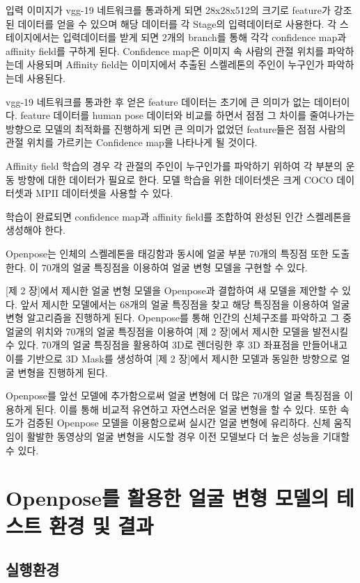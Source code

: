 \documentclass{oblivoir}
\begin{document}
입력 이미지가 vgg-19 네트워크를 통과하게 되면 28x28x512의 크기로 feature가 강조된 데이터를 얻을 수 있으며 해당 데이터를 각 Stage의 입력데이터로 사용한다. 각 스테이지에서는 입력데이터를 받게 되면 2개의 branch를 통해 각각 confidence map과 affinity field를 구하게 된다. Confidence map은 이미지 속 사람의 관절 위치를 파악하는데 사용되며 Affinity field는 이미지에서 추출된 스켈레톤의 주인이 누구인가 파악하는데 사용된다.

vgg-19 네트워크를 통과한 후 얻은 feature 데이터는 초기에 큰 의미가 없는 데이터이다. feature 데이터를 human pose 데이터와 비교를 하면서 점점 그 차이를 줄여나가는 방향으로 모델의 최적화를 진행하게 되면 큰 의미가 없었던 feature들은 점점 사람의 관절 위치를 가르키는 Confidence map을 나타나게 될 것이다.

Affinity field 학습의 경우 각 관절의 주인이 누구인가를 파악하기 위하여 각 부분의 운동 방향에 대한 데이터가 필요로 한다. 모델 학습을 위한 데이터셋은 크게 COCO 데이터셋과 MPII 데이터셋을 사용할 수 있다.

학습이 완료되면 confidence map과 affinity field를 조합하여 완성된 인간 스켈레톤을 생성해야 한다.

Openpose는 인체의 스켈레톤을 태깅함과 동시에 얼굴 부분 70개의 특징점 또한 도출 한다. 이 70개의 얼굴 특징점을 이용하여 얼굴 변형 모델을 구현할 수 있다.

[제 2 장]에서 제시한 얼굴 변형 모델을 Openpose과 결합하여 새 모델을 제안할 수 있다. 앞서 제시한 모델에서는 68개의 얼굴 특징점을 찾고 해당 특징점을 이용하여 얼굴 변형 알고리즘을 진행하게 된다. Openpose를 통해 인간의 신체구조를 파악하고 그 중 얼굴의 위치와 70개의 얼굴 특징점을 이용하여 [제 2 장]에서 제시한 모델을 발전시킬 수 있다. 70개의 얼굴 특징점을 활용하여 3D로 렌더링한 후 3D 좌표점을 만들어내고 이를 기반으로 3D Mask를 생성하여 [제 2 장]에서 제시한 모델과 동일한 방향으로 얼굴 변형을 진행하게 된다.

Openpose를 앞선 모델에 추가함으로써 얼굴 변형에 더 많은 70개의 얼굴 특징점을 이용하게 된다. 이를 통해 비교적 유연하고 자연스러운 얼굴 변형을 할 수 있다. 또한 속도가 검증된 Openpose 모델을 이용함으로써 실시간 얼굴 변형에 유리하다. 신체 움직임이 활발한 동영상의 얼굴 변형을 시도할 경우 이전 모델보다 더 높은 성능을 기대할 수 있다.

\section{Openpose를 활용한 얼굴 변형 모델의 테스트 환경 및 결과}

\subsection{실행환경}
\end{document}
